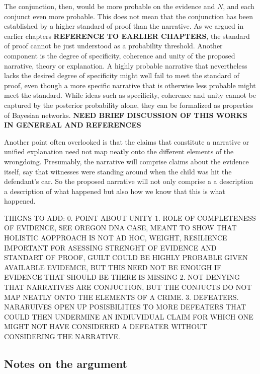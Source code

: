 \documentclass[
  10pt,
  dvipsnames,enabledeprecatedfontcommands]{scrartcl}
\begin{document}
The conjunction, then, would be more probable on the evidence and \(N\),
and each conjunct even more probable. This does not mean that the
conjunction has been established by a higher standard of proof than the
narrative. As we argued in earlier chapters
\textbf{REFERENCE TO EARLIER CHAPTERS}, the standard of proof cannot be
just understood as a probability threshold. Another component is the
degree of specificity, coherence and unity of the proposed narrative,
theory or explanation. A highly probable narrative that nevertheless
lacks the desired degree of specificity might well fail to meet the
standard of proof, even though a more specific narrative that is
otherwise less probable might meet the standard. While ideas such as
specificity, coherence and unity cannot be captured by the posterior
probability alone, they can be formalized as properties of Bayesian
networks.
\textbf{NEED BRIEF DISCUSSION OF THIS WORKS IN GENEREAL AND REFERENCES}

Another point often overlooked is that the claims that constitute a
narrative or unified explanation need not map neatly onto the different
elements of the wrongdoing. Presumably, the narrative will comprise
claims about the evidence itself, say that witnesses were standing
around when the child was hit the defendant's car. So the proposed
narrative will not only comprise a a description a description of what
happened but also how we know that this is what happened.

THIGNS TO ADD: 0. POINT ABOUT UNITY 1. ROLE OF COMPLETENESS OF EVIDENCE,
SEE OREGON DNA CASE, MEANT TO SHOW THAT HOLISTIC AOPPROACH IS NOT AD
HOC, WEIGHT, RESILIENCE IMPORTANT FOR ASESSING STRENGHT OF EVIDENCE AND
STANDART OF PROOF, GUILT COULD BE HIGHLY PROBABLE GIVEN AVAILABLE
EVIDEMCE, BUT THIS NEED NOT BE ENOUGH IF EVIDENCE THAT SHOULD BE THERE
IS MISSING 2. NOT DENYING THAT NARRATIVES ARE CONJUCTION, BUT THE
CONJUCTS DO NOT MAP NEATLY ONTO THE ELEMENTS OF A CRIME. 3. DEFEATERS.
NARARUIVES OPEN UP POSISBILITIES TO MORE DEFEATERS THAT COULD THEN
UNDERMINE AN INDIUVIDUAL CLAIM FOR WHICH ONE MIGHT NOT HAVE CONSIDERED A
DEFEATER WITHOUT CONSIDERING THE NARRATIVE.

\hypertarget{notes-on-the-argument}{%
\subsection{Notes on the argument}\label{notes-on-the-argument}}
\end{document}
